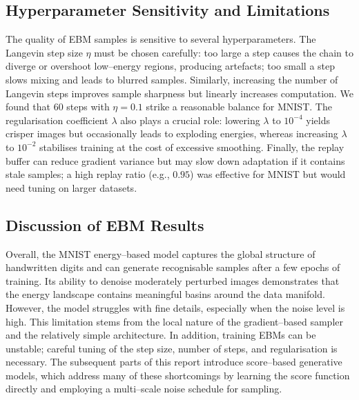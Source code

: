 \subsection{Hyperparameter Sensitivity and Limitations}

The quality of EBM samples is sensitive to several hyperparameters.  The
Langevin step size $\eta$ must be chosen carefully: too large a step
causes the chain to diverge or overshoot low–energy regions, producing
artefacts; too small a step slows mixing and leads to blurred samples.
Similarly, increasing the number of Langevin steps improves sample sharpness
but linearly increases computation.  We found that 60 steps with
$\eta=0.1$ strike a reasonable balance for MNIST.  The regularisation
coefficient $\lambda$ also plays a crucial role: lowering $\lambda$ to
$10^{-4}$ yields crisper images but occasionally leads to exploding
energies, whereas increasing $\lambda$ to $10^{-2}$ stabilises training at
the cost of excessive smoothing.  Finally, the replay buffer can reduce
gradient variance but may slow down adaptation if it contains stale
samples; a high replay ratio (e.g., $0.95$) was effective for MNIST but
would need tuning on larger datasets.

\subsection{Discussion of EBM Results}

Overall, the MNIST energy–based model captures the global structure of
handwritten digits and can generate recognisable samples after a few
epochs of training.  Its ability to denoise moderately perturbed images
demonstrates that the energy landscape contains meaningful basins around
the data manifold.  However, the model struggles with fine details,
especially when the noise level is high.  This limitation stems from the
local nature of the gradient–based sampler and the relatively simple
architecture.  In addition, training EBMs can be unstable; careful tuning
of the step size, number of steps, and regularisation is necessary.  The
subsequent parts of this report introduce score–based generative models,
which address many of these shortcomings by learning the score function
directly and employing a multi–scale noise schedule for sampling.

